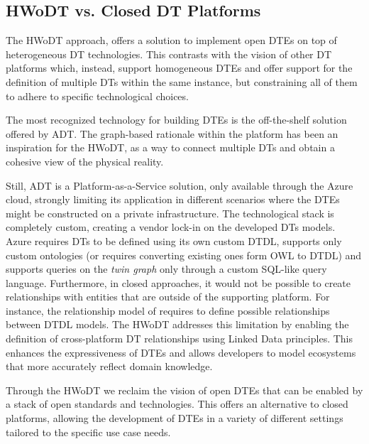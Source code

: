 \subsection{HWoDT vs. Closed DT Platforms}

The \ac{HWoDT} approach, offers a solution to implement open \acp{DTE} on top of heterogeneous \ac{DT} technologies.
%
This contrasts with the vision of other \ac{DT} platforms which, instead, support homogeneous \acp{DTE} and offer support for the definition of multiple \acp{DT} within the same instance, but constraining all of them to adhere to specific technological choices.

The most recognized technology for building \acp{DTE} is the off-the-shelf solution offered by \acl{ADT}.
The graph-based rationale within the platform has been an inspiration for the \ac{HWoDT}, as a way to connect multiple \acp{DT} and obtain a cohesive view of the physical reality.

Still, \acl{ADT} is a Platform-as-a-Service solution, only available through the Azure cloud, strongly limiting its application in different scenarios where the \acp{DTE} might be constructed on a private infrastructure.
%
The technological stack is completely custom, creating a vendor lock-in on the developed \acp{DT} models.
% 
Azure requires \acp{DT} to be defined using its own custom \ac{DTDL}, supports only custom ontologies (or requires converting existing ones form \ac{OWL} to \ac{DTDL}) and supports queries on the \emph{twin graph} only through a custom SQL-like query language.
%
Furthermore, in closed approaches, it would not be possible to create relationships with entities that are outside of the supporting platform. For instance, the relationship model of \azureTwin{} requires to define possible relationships between \ac{DTDL} models.
%
The \ac{HWoDT} addresses this limitation by enabling the definition of cross-platform \ac{DT} relationships using Linked Data principles.   
This enhances the expressiveness of \acp{DTE} and allows developers to model ecosystems that more accurately reflect domain knowledge.

Through the \ac{HWoDT} we reclaim the vision of open \acp{DTE} that can be enabled by a stack of open standards and technologies. 
%
This offers an alternative to closed platforms, allowing the development of \acp{DTE} in a variety of different settings tailored to the specific use case needs.

